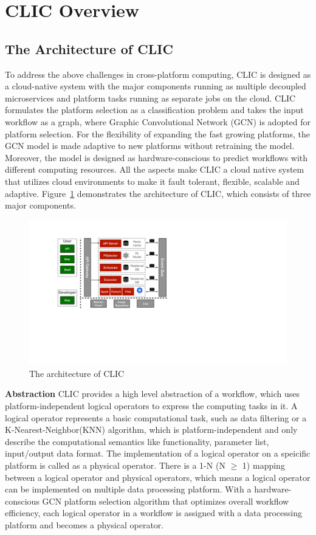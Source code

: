 \section{CLIC Overview}

\subsection{The Architecture of CLIC}

To address the above challenges in cross-platform computing, CLIC is designed as a cloud-native system with the major components running as multiple decoupled microservices and platform tasks running as separate jobs on the cloud.
CLIC formulates the platform selection as a classification problem and takes the input workflow as a graph, 
where Graphic Convolutional Network (GCN) is adopted for platform selection.
For the flexibility of expanding the fast growing platforms, the GCN model is made adaptive to new platforms without retraining the model.
Moreover, the model is designed as hardware-conscious to predict workflows with different computing resources.
All the aspects make CLIC a cloud native system that utilizes cloud environments to make it fault tolerant, flexible, scalable and adaptive.
Figure~\ref{fig:architecture} demonstrates the architecture of CLIC, which consists of three major components. 



\begin{figure}[tbh]
  \centering
  \includegraphics[width=0.8\linewidth]{figures/CLIC-arch-2.pdf}
  \caption{The architecture of CLIC}
  \label{fig:architecture}
\end{figure}

\textbf{Abstraction} CLIC provides a high level abstraction of a workflow, which uses platform-independent logical operators to express the computing tasks in it. 
A logical operator represents a basic computational task, such as data filtering or a K-Nearest-Neighbor(KNN) algorithm, which is platform-independent and only describe the computational semantics like functionality, parameter list, input/output data format.
The implementation of a logical operator on a speicific platform is called as a physical operator.
There is a 1-N (N $\ge$ 1) mapping between a logical operator and physical operators, which means a logical operator can be implemented on multiple data processing platform.
With a hardware-conscious GCN platform selection algorithm that optimizes overall workflow efficiency, each logical operator in a workflow is assigned with a data processing platform and becomes a physical operator.

